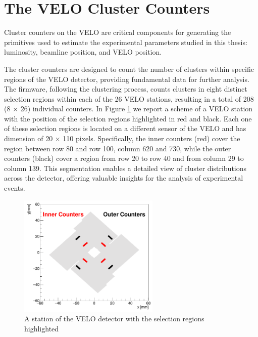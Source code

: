 \section{The VELO Cluster Counters}\label{sec:velo_counters}
Cluster counters on the VELO are critical components for generating the primitives used to estimate the experimental parameters studied in this thesis: luminosity, beamline position, and VELO position. 

The cluster counters are designed to count the number of clusters within specific regions of the VELO detector, providing fundamental data for further analysis. The firmware, following the clustering process, counts clusters in eight distinct selection regions within each of the 26 VELO stations, resulting in a total of 208 (8 × 26) individual counters. In Figure \ref{fig:VELO-counters} we report a scheme of a VELO station with the position of the selection regions highlighted in red and black. Each one of these selection regions is located on a different sensor of the VELO and has dimension of 20 × 110 pixels. Specifically, the inner counters (red) cover the region between row 80 and row 100, column 620 and 730, while the outer counters (black) cover a region from row 20 to row 40 and from column 29 to column 139. This segmentation enables a detailed view of cluster distributions across the detector, offering valuable insights for the analysis of experimental events.%


\begin{figure}
    \centering
    \includegraphics[width=0.6\textwidth]{figures/counters.png}
    \caption{A station of the VELO detector with the selection regions highlighted}
    \label{fig:VELO-counters}
\end{figure}

